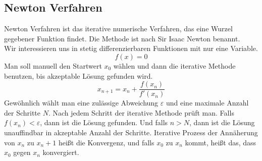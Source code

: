 \documentclass[a4paper,12pt]{llncs}
\numberwithin{equation}{section}
\begin{document}
\subsection{Newton Verfahren}
Newton Verfahren ist das iterative numerische Verfahren, das eine Wurzel gegebener Funktion findet.	Die Methode ist nach Sir Isaac Newton benannt. \\
Wir interessieren uns in stetig differenzierbaren Funktionen mit nur eine Variable.
\[
f(x) = 0
\] 
Man soll manuell den Startwert $x_0$ wählen und dann die iterative Methode benutzen, bis akzeptable Lösung gefunden wird.
\[
x_{n+1} = x_n + \frac{f(x_n)}{f'(x_n)}
\] 
Gewöhnlich wählt man eine zulässige Abweichung $\varepsilon$ und eine maximale Anzahl der Schritte $N$.
Nach jedem Schritt der iterative Methode prüft man. Falls $f(x_n)  < \varepsilon$, dann ist die Lösung gefunden.
Und falls $n > N$, dann ist die Lösung unauffindbar in akzeptable Anzahl der Schritte. 
Iterative Prozess der Annäherung von $x_n$ zu $x_n+1$ heißt die Konvergenz, und falls $x_0$ zu $x_n$ kommt, heißt das, dass $x_0$ gegen $x_n$ konvergiert.
\end{document}
